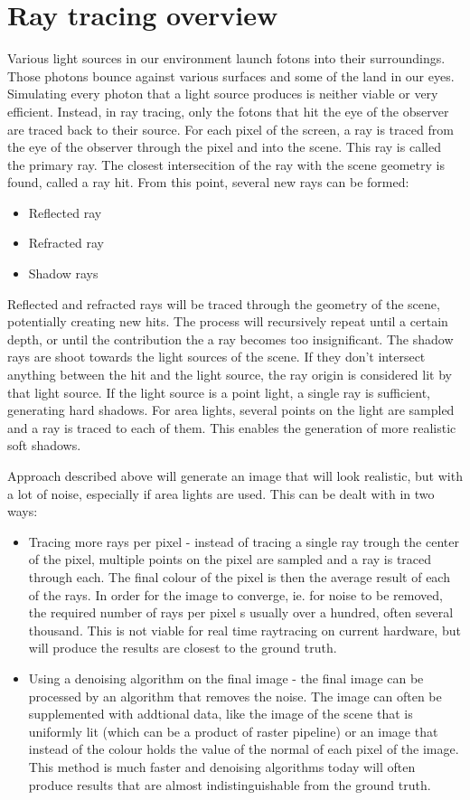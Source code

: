 \documentclass[times, utf8, zavrsni, numeric]{fer}
\begin{document}
\section{Ray tracing overview}
Various light sources in our environment launch fotons into their surroundings. Those photons bounce against various surfaces and some of the land in our eyes. Simulating every photon that a light source produces is neither viable or very efficient. Instead, in ray tracing, only the fotons that hit the eye of the observer are traced back to their source. For each pixel of the screen, a ray is traced from the eye of the observer through the pixel and into the scene. This ray is called the primary ray. The closest intersecition of the ray with the scene geometry is found, called a ray hit. From this point, several new rays can be formed:
\begin{itemize}
	\item Reflected ray
	\item Refracted ray
	\item Shadow rays
\end{itemize}

Reflected and refracted rays will be traced through the geometry of the scene, potentially creating new hits. The process will recursively repeat until a certain depth, or until the contribution the a ray becomes too insignificant. The shadow rays are shoot towards the light sources of the scene. If they don't intersect anything between the hit and the light source, the ray origin is considered lit by that light source. If the light source is a point light, a single ray is sufficient, generating hard shadows. For area lights, several points on the light are sampled and a ray is traced to each of them. This enables the generation of more realistic soft shadows.

Approach described above will generate an image that will look realistic, but with a lot of noise, especially if area lights are used. This can be dealt with in two ways:
\begin{itemize}
	\item Tracing more rays per pixel - instead of tracing a single ray trough the center of the pixel, multiple points on the pixel are sampled and a ray is traced through each. The final colour of the pixel is then the average result of each of the rays. In order for the image to converge, ie. for noise to be removed, the required number of rays per pixel s usually over a hundred, often several thousand. This is not viable for real time raytracing on current hardware, but will produce the results are closest to the ground truth.
	\item Using a denoising algorithm on the final image - the final image can be processed by an algorithm that removes the noise. The image can often be supplemented with addtional data, like the image of the scene that is uniformly lit (which can be a product of raster pipeline) or an image that instead of the colour holds the value of the normal of each pixel of the image. This method is much faster and denoising algorithms today will often produce results that are almost indistinguishable from the ground truth.
\end{itemize}
\end{document}
